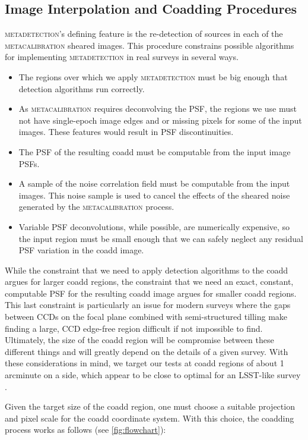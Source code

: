 \documentclass[twocolappendix, appendixfloats, numberedappendix, twocolumn, apj]{openjournal}
\newcommand{\mdet}{\textsc{metadetection}\xspace}
\newcommand{\mcal}{\textsc{metacalibration}\xspace}
\begin{document}
\subsection{Image Interpolation and Coadding Procedures}

\mdet's defining feature is the re-detection of sources in each of the \mcal
sheared images. This procedure constrains possible algorithms for implementing
\mdet in real surveys in several ways.

\begin{itemize}
  \item The regions over which we apply \mdet
  must be big enough that detection algorithms run correctly.
  \item As \mcal requires deconvolving the PSF, the regions we use must not have
  single-epoch image edges and or missing pixels for some of the input images. These features
  would result in PSF discontinuities.
  \item The PSF of the resulting coadd must be computable from the input image PSFs.
  \item A sample of the noise correlation field must be computable from the input images.
  This noise sample is used to cancel the effects of the sheared noise generated
  by the \mcal process.
  \item Variable PSF deconvolutions, while possible, are numerically expensive, so the input
  region must be small enough that we can safely neglect any residual PSF variation in the coadd image.
\end{itemize}

While the constraint that we need to apply detection algorithms to the coadd argues
for larger coadd regions, the constraint that we need an exact, constant, computable
PSF for the resulting coadd image argues for smaller coadd regions. This last constraint is
particularly an issue for modern surveys where the gaps between CCDs on the focal plane
combined with semi-structured tilling make finding a large, CCD edge-free region difficult
if not impossible to find. Ultimately, the size of the coadd region will be compromise
between these different things and will greatly depend on the details of a given survey.
With these considerations in mind, we target our tests at coadd regions of about 1 arcminute
on a side, which appear to be close to optimal for an LSST-like survey \citep{ArmstrongCoadd}.

Given the target size of the coadd region, one must choose a suitable projection
and pixel scale for the coadd coordinate system. With this choice, the coadding process
works as follows (see \ref{fig:flowchart}):
\end{document}
